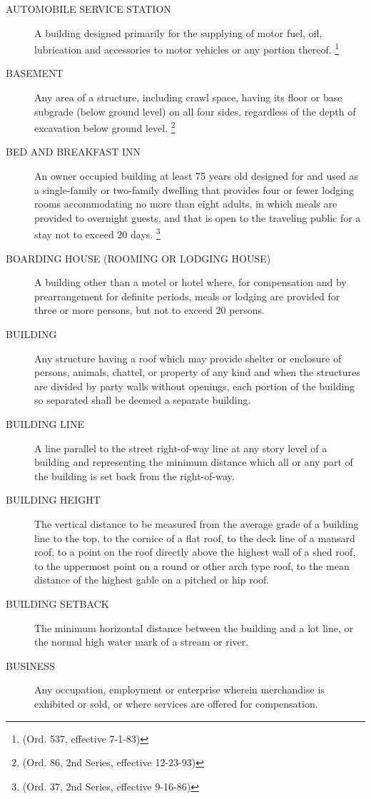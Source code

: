 \begin{description}
    \item[AUTOMOBILE SERVICE STATION] A building designed primarily for the supplying of motor fuel, oil, lubrication and accessories to motor vehicles or any portion thereof. \footnote{(Ord. 537, effective 7-1-83)}
    \item[BASEMENT] Any area of a structure, including crawl space, having its floor or base subgrade (below ground level) on all four sides, regardless of the depth of excavation below ground level. \footnote{(Ord. 86, 2nd Series, effective 12-23-93)}
    \item[BED AND BREAKFAST INN] An owner occupied building at least 75 years old designed for and used as a single-family or two-family dwelling that provides four or fewer lodging rooms accommodating no more than eight adults, in which meals are provided to overnight guests, and that is open to the traveling public for a stay not to exceed 20 days. \footnote{(Ord. 37, 2nd Series, effective 9-16-86)}
    \item[BOARDING HOUSE (ROOMING OR LODGING HOUSE)] A building other than a motel or hotel where, for compensation and by prearrangement for definite periods, meals or lodging are provided for three or more persons, but not to exceed 20 persons.
    \item[BUILDING] Any structure having a roof which may provide shelter or enclosure of persons, animals, chattel, or property of any kind and when the structures are divided by party walls without openings, each portion of the building so separated shall be deemed a separate building.
    \item[BUILDING LINE] A line parallel to the street right-of-way line at any story level of a building and representing the minimum distance which all or any part of the building is set back from the right-of-way.
    \item[BUILDING HEIGHT] The vertical distance to be measured from the average grade of a building line to the top, to the cornice of a flat roof, to the deck line of a mansard roof, to a point on the roof directly above the highest wall of a shed roof, to the uppermost point on a round or other arch type roof, to the mean distance of the highest gable on a pitched or hip roof.
    \item[BUILDING SETBACK] The minimum horizontal distance between the building and a lot line, or the normal high water mark of a stream or river.
    \item[BUSINESS] Any occupation, employment or enterprise wherein merchandise is exhibited or sold, or where services are offered for compensation.

\end{description}
